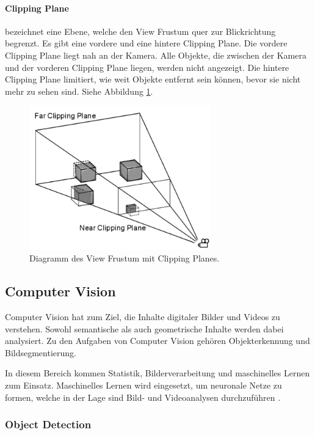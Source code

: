 \paragraph{Clipping Plane}
bezeichnet eine Ebene, welche den View Frustum quer zur Blickrichtung begrenzt. Es gibt eine vordere und eine hintere Clipping Plane. Die vordere Clipping Plane liegt nah an der Kamera. Alle Objekte, die zwischen der Kamera und der vorderen Clipping Plane liegen, werden nicht angezeigt. Die hintere Clipping Plane limitiert, wie weit Objekte entfernt sein können, bevor sie nicht mehr zu sehen sind. Siehe Abbildung \ref{dia:clipping}.\citep{unityclipping}

\begin{figure}[H]
	\centering
	\includegraphics[width=0.7\textwidth]{images/dia_ViewFrustum.png}
	\caption[View Frustum]{Diagramm des View Frustum mit Clipping Planes.}
	\label{dia:clipping}
\end{figure}


\subsection{Computer Vision}
Computer Vision hat zum Ziel, die Inhalte digitaler Bilder und Videos zu verstehen. Sowohl semantische als auch geometrische Inhalte werden dabei analysiert. 
Zu den Aufgaben von Computer Vision gehören Objekterkennung und Bildsegmentierung.

In diesem Bereich kommen Statistik, Bilderverarbeitung und maschinelles Lernen zum Einsatz. Maschinelles Lernen wird eingesetzt, um neuronale Netze zu formen, welche in der Lage sind Bild- und Videoanalysen durchzuführen
.\citep{intortodeeplearingmedical}

\subsubsection{Object Detection}


